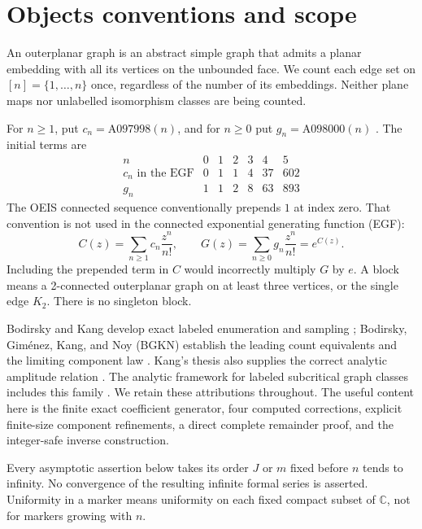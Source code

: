 \documentclass[11pt,letterpaper]{article}
\numberwithin{equation}{section}
\theoremstyle{remark}\newtheorem{remark}[theorem]{Remark}
\newcommand{\CC}{\mathbb C}
\begin{document}
\section{Objects conventions and scope}\label{lop:sec:scope}

An outerplanar graph is an abstract simple graph that admits a planar
embedding with all its vertices on the unbounded face. We count each
edge set on $[n]=\{1,\ldots,n\}$ once, regardless of the number of its
embeddings. Neither plane maps nor unlabelled isomorphism classes are
being counted.

For $n\geq1$, put $c_n=\mathrm{A097998}(n)$, and for $n\geq0$ put
$g_n=\mathrm{A098000}(n)$ \cite{oeisconn,oeisall}. The initial terms are
\[
\begin{array}{c|rrrrrr}
n&0&1&2&3&4&5\\\hline
c_n\text{ in the EGF}&0&1&1&4&37&602\\
g_n&1&1&2&8&63&893
\end{array}
\]
The OEIS connected sequence conventionally prepends $1$ at index zero.
That convention is not used in the connected exponential generating
function (EGF):
\begin{equation}\label{lop:eq:egfs}
 C(z)=\sum_{n\geq1}c_n\frac{z^n}{n!},\qquad
 G(z)=\sum_{n\geq0}g_n\frac{z^n}{n!}=e^{C(z)}.
\end{equation}
Including the prepended term in $C$ would incorrectly multiply $G$ by
$e$. A block means a 2-connected outerplanar graph on at least three
vertices, or the single edge $K_2$. There is no singleton block.

Bodirsky and Kang develop exact labeled enumeration and sampling
\cite{bk}; Bodirsky, Gim\'enez, Kang, and Noy (BGKN) establish the leading
count equivalents and the limiting component law \cite{bgkn}. Kang's
thesis also supplies the correct analytic amplitude relation
\cite{kang}. The analytic framework for labeled subcritical graph
classes includes this family \cite{subcritical}. We retain these
attributions throughout. The useful content here is the finite exact
coefficient generator, four computed corrections, explicit finite-size
component refinements, a direct complete remainder proof, and the
integer-safe inverse construction.

Every asymptotic assertion below takes its order $J$ or $m$ fixed before
$n$ tends to infinity. No convergence of the resulting infinite formal
series is asserted. Uniformity in a marker means uniformity on each
fixed compact subset of $\CC$, not for markers growing with $n$.
\end{document}
